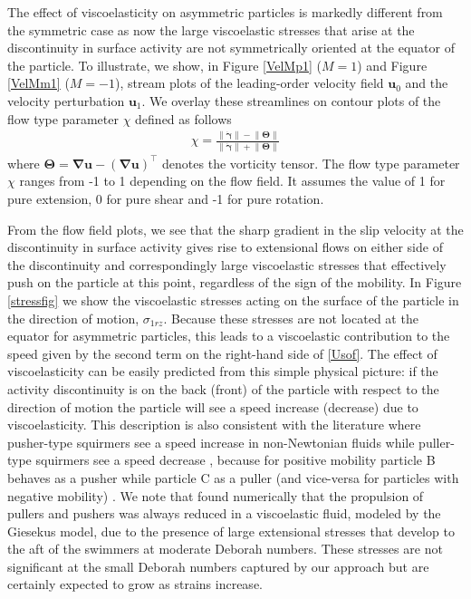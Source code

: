 \documentclass[aps,pre,reprint,twocolumn,notitlepage,superscriptaddress]{revtex4-1}
\begin{document}
The effect of viscoelasticity on asymmetric particles is markedly different from the symmetric case as now the large viscoelastic stresses that arise at the discontinuity in surface activity are not symmetrically oriented at the equator of the particle. To illustrate, we show, in Figure \ref{VelMp1} ($M=1$) and Figure \ref{VelMm1} ($M=-1$), stream plots of the leading-order velocity field $\boldsymbol{u}_0$ and the velocity perturbation $\boldsymbol{u}_1$. We overlay these streamlines on contour plots of the flow type parameter $\chi$ \citep{patil2006constitutive} defined as follows 
\begin{align}\label{chi}
\chi=\frac{\lVert\dot{\boldsymbol{\gamma}}\rVert-\lVert\boldsymbol{\Theta}\rVert}{\lVert\dot{\boldsymbol{\gamma}}\rVert+\lVert\boldsymbol{\Theta}\rVert}
\end{align}
where $\boldsymbol{\Theta}=\boldsymbol{\nabla}\boldsymbol{u}-\left(\boldsymbol{\nabla}\boldsymbol{u}\right)^\top$ denotes the vorticity tensor. The flow type parameter $\chi$ ranges from -1 to 1 depending on the flow field. It assumes the value of 1 for pure extension, 0 for pure shear and -1 for pure rotation.

From the flow field plots, we see that the sharp gradient in the slip velocity at the discontinuity in surface activity gives rise to extensional flows on either side of the discontinuity and correspondingly large viscoelastic stresses that effectively push on the particle at this point, regardless of the sign of the mobility. In Figure \ref{stressfig} we show the viscoelastic stresses acting on the surface of the particle in the direction of motion, $\sigma_{1rz}$. Because these stresses are not located at the equator for asymmetric particles, this leads to a viscoelastic contribution to the speed given by the second term on the right-hand side of \eqref{Usof}. The effect of viscoelasticity can be easily predicted from this simple physical picture: if the activity discontinuity is on the back (front) of the particle with respect to the direction of motion the particle will see a speed increase (decrease) due to viscoelasticity. This description is also consistent with the literature where pusher-type squirmers see a speed increase in non-Newtonian fluids while puller-type squirmers see a speed decrease \citep{decorato15, datt2017active}, because for positive mobility particle B behaves as a pusher while particle C as a puller (and vice-versa for particles with negative mobility) \citep{datt2017active}. We note that \citet{zhu2012self} found numerically that the propulsion of pullers and pushers was always reduced in a viscoelastic fluid, modeled by the Giesekus model, due to the presence of large extensional stresses that develop to the aft of the swimmers at moderate Deborah numbers. These stresses are not significant at the small Deborah numbers captured by our approach but are certainly expected to grow as strains increase.
\end{document}
